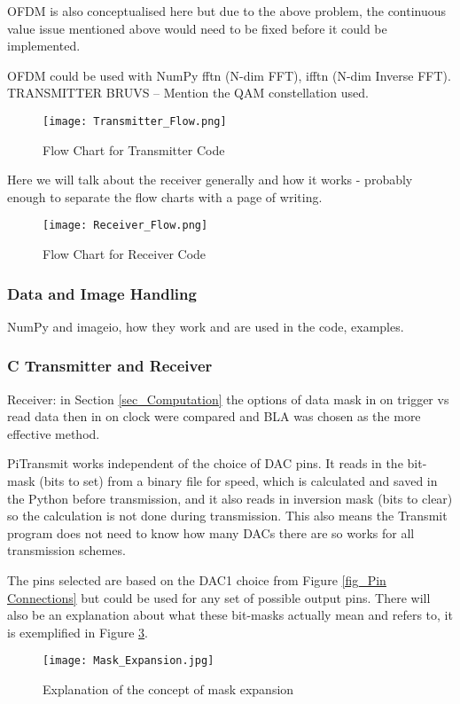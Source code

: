 \documentclass[../main.tex]{subfiles}
\begin{document}
OFDM is also conceptualised here but due to the above problem, the continuous value issue mentioned above would need to be fixed before it could be implemented.

OFDM could be used with NumPy fftn (N-dim FFT), ifftn (N-dim Inverse FFT).\\

TRANSMITTER BRUVS -- 
Mention the QAM constellation used.\\

\begin{figure}[ht]
	\centering
	\texttt{[image: Transmitter\_Flow.png]}
	\caption{Flow Chart for Transmitter Code}
	\label{fig_Transmitter_Flow}
\end{figure}

Here we will talk about the receiver generally and how it works - probably enough to separate the flow charts with a page of writing.\\

\begin{figure}[ht]
	\centering
	\texttt{[image: Receiver\_Flow.png]}
	\caption{Flow Chart for Receiver Code}
	\label{fig_Receiver_Flow}
\end{figure}

\subsubsection{Data and Image Handling}

NumPy and imageio, how they work and are used in the code, examples.\\

\subsubsection{C Transmitter and Receiver}

Receiver: in Section \ref{sec_Computation} the options of data mask in on trigger vs read data then in on clock were compared and BLA was chosen as the more effective method.

PiTransmit works independent of the choice of DAC pins.
It reads in the bit-mask (bits to set) from a binary file for speed, which is calculated and saved in the Python before transmission, and it also reads in inversion mask (bits to clear) so the calculation is not done during transmission.
This also means the Transmit program does not need to know how many DACs there are so works for all transmission schemes.

The pins selected are based on the DAC1 choice from Figure \ref{fig_Pin Connections} but could be used for any set of possible output pins.
There will also be an explanation about what these bit-masks actually mean and refers to, it is exemplified in Figure \ref{fig_Mask Expansion}.

\begin{figure}[ht]
	\centering
	\texttt{[image: Mask\_Expansion.jpg]}
	\caption{Explanation of the concept of mask expansion}
	\label{fig_Mask Expansion}
\end{figure}
\end{document}
